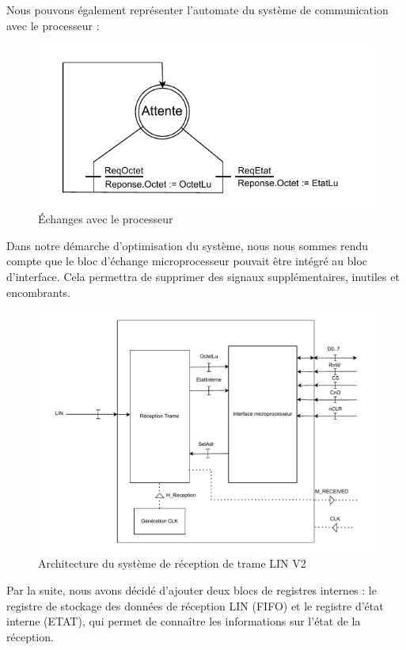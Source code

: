 Nous pouvons également représenter l’automate du système de communication avec le processeur : 

\begin{figure}[H]
    \centering
    \includegraphics[width=0.8\linewidth]{images/inter/Echange_Processeur.pdf}
    \caption{Échanges avec le processeur}
    \label{fig:placeholder}
\end{figure}


Dans notre démarche d’optimisation du système, nous nous sommes rendu compte que le bloc d’échange microprocesseur pouvait être intégré au bloc d’interface. Cela permettra de supprimer des signaux supplémentaires, inutiles et encombrants.
\newline

\begin{figure}[H]
    \centering
    \includegraphics[width=0.8\linewidth]{images/inter/Schema_avance_circuit.pdf}
    \caption{Architecture du système de réception de trame LIN V2}
    \label{fig:placeholder}
\end{figure}

Par la suite, nous avons décidé d’ajouter deux blocs de registres internes : le registre de stockage des données de réception LIN (FIFO) et le registre d’état interne (ETAT), qui permet de connaître les informations sur l’état de la réception.
\newline


